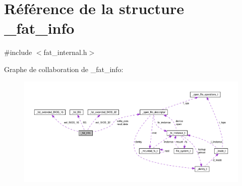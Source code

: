 \hypertarget{struct__fat__info}{\section{\-Référence de la structure \-\_\-fat\-\_\-info}
\label{struct__fat__info}
}


{\ttfamily \#include $<$fat\-\_\-internal.\-h$>$}



\-Graphe de collaboration de \-\_\-fat\-\_\-info\-:\nopagebreak
\begin{figure}[H]
\begin{center}
\leavevmode
\includegraphics[width=350pt]{struct__fat__info__coll__graph}
\end{center}
\end{figure}
